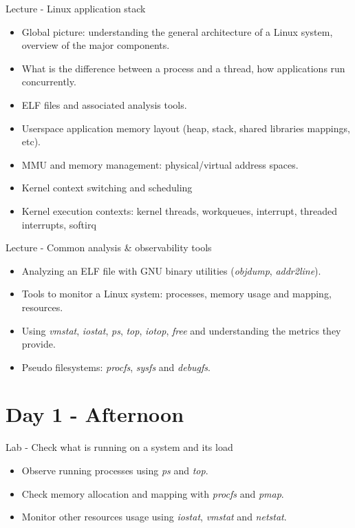 \documentclass[a4paper,12pt,obeyspaces,spaces,hyphens]{article}
\begin{document}
\feagendaonecolumn
{Lecture - Linux application stack}
{
  \begin{itemize}
  \item Global picture: understanding the general architecture of a
        Linux system, overview of the major components.
  \item What is the difference between a process and a thread, how
    applications run concurrently.
  \item ELF files and associated analysis tools.
  \item Userspace application memory layout (heap, stack, shared
    libraries mappings, etc).
  \item MMU and memory management: physical/virtual address spaces.
  \item Kernel context switching and scheduling
  \item Kernel execution contexts: kernel threads, workqueues,
    interrupt, threaded interrupts, softirq
  \end{itemize}
}

\feagendaonecolumn
{Lecture - Common analysis \& observability tools}
{
  \begin{itemize}
  \item Analyzing an ELF file with GNU binary utilities
    ({\em objdump}, {\em addr2line}).
  \item Tools to monitor a Linux system: processes, memory
    usage and mapping, resources.
  \item Using {\em vmstat}, {\em iostat}, {\em ps}, {\em top}, {\em
      iotop}, {\em free} and understanding the metrics they provide.
  \item Pseudo filesystems: {\em procfs}, {\em sysfs} and {\em
      debugfs}.
  \end{itemize}
}
\section{Day 1 - Afternoon}
\feagendaonecolumn
{Lab - Check what is running on a system and its load}
{
  \begin{itemize}
  \item Observe running processes using {\em ps} and {\em top}.
  \item Check memory allocation and mapping with {\em procfs} and {\em
      pmap}.
  \item Monitor other resources usage using {\em iostat}, {\em vmstat}
    and {\em netstat}.
  \end{itemize}
}
\end{document}
